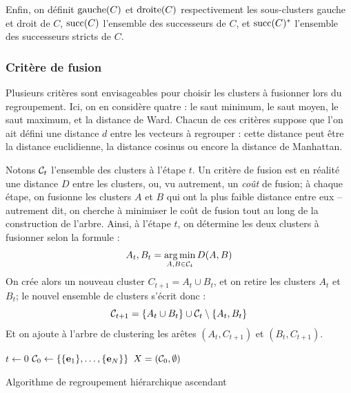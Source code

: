 Enfin, on définit $\gauche(C)$ et $\droite(C)$ respectivement les sous-clusters gauche et droit de $C$, $\succs(C)$ l'ensemble des successeurs de $C$, et $\succs(C)^*$ l'ensemble des successeurs stricts de $C$.

\subsubsection{Critère de fusion}
\label{sec:te-clustering-linkage}

Plusieurs critères sont envisageables pour choisir les clusters à fusionner lors du regroupement. Ici, on en considère quatre : le saut minimum, le saut moyen, le saut maximum, et la distance de Ward. Chacun de ces critères suppose que l'on ait défini une distance $d$ entre les vecteurs à regrouper : cette distance peut être la distance euclidienne, la distance cosinus ou encore la distance de Manhattan. 

Notons $\cal{C}_t$ l'ensemble des clusters à l'étape $t$. Un critère de fusion est en réalité une distance $D$ entre les clusters, ou, vu autrement, un \textit{coût} de fusion; à chaque étape, on fusionne les clusters $A$ et $B$ qui ont la plus faible distance entre eux – autrement dit, on cherche à minimiser le coût de fusion tout au long de la construction de l'arbre. Ainsi, à l'étape $t$, on détermine les deux clusters à fusionner selon la formule :
\begin{equation}
    A_t, B_t = \argmin_{A, B \in \cal{C}_t} D(A, B)
\end{equation}
On crée alors un nouveau cluster $C_{t+1} = A_t \cup B_t$, et on retire les clusters $A_t$ et $B_t$; le nouvel ensemble de clusters s'écrit donc :
\begin{equation}
    \cal{C}_{t+1} = \{ A_t \cup B_t \} \cup \cal{C}_t \setminus \{ A_t, B_t \}
\end{equation}
Et on ajoute à l'arbre de clustering les arêtes $(A_t, C_{t+1})$ et $(B_t, C_{t+1})$.



\begin{algorithm}
$t \leftarrow  0$ \;
$\cal{C}_0 \leftarrow  \left\{ \{\bf{e}_1\}, \ldots, \{\bf{e}_N\} \right\}$\;
$X = (\cal{C}_0, \emptyset)$ \;

\caption{Algorithme de regroupement hiérarchique ascendant}
\label{algo:te-clustering}
\end{algorithm}


